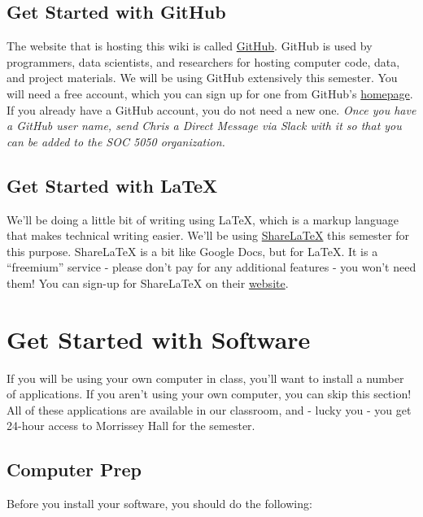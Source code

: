 \documentclass[]{book}
\theoremstyle{definition}
\theoremstyle{definition}
\theoremstyle{remark}
\begin{document}
\subsection{Get Started with GitHub}\label{get-started-with-github}

The website that is hosting this wiki is called
\href{https://github.com/}{GitHub}. GitHub is used by programmers, data
scientists, and researchers for hosting computer code, data, and project
materials. We will be using GitHub extensively this semester. You will
need a free account, which you can sign up for one from GitHub's
\href{https://github.com/}{homepage}. If you already have a GitHub
account, you do not need a new one. \emph{Once you have a GitHub user
name, send Chris a Direct Message via Slack with it so that you can be
added to the SOC 5050 organization.}

\subsection{Get Started with LaTeX}\label{get-started-with-latex}

We'll be doing a little bit of writing using LaTeX, which is a markup
language that makes technical writing easier. We'll be using
\href{https://www.sharelatex.com}{ShareLaTeX} this semester for this
purpose. ShareLaTeX is a bit like Google Docs, but for LaTeX. It is a
``freemium'' service - please don't pay for any additional features -
you won't need them! You can sign-up for ShareLaTeX on their
\href{https://www.sharelatex.com}{website}.

\section{Get Started with Software}\label{get-started-with-software}

If you will be using your own computer in class, you'll want to install
a number of applications. If you aren't using your own computer, you can
skip this section! All of these applications are available in our
classroom, and - lucky you - you get 24-hour access to Morrissey Hall
for the semester.

\subsection{Computer Prep}\label{computer-prep}

Before you install your software, you should do the following:
\end{document}
